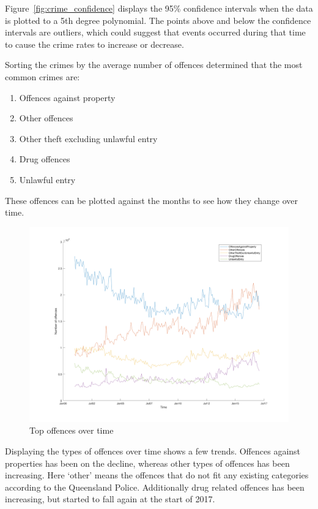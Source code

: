 \documentclass[]{article}
\begin{document}
Figure~\ref{fig:crime_confidence} displays the 95\% confidence intervals when the data is plotted to a 5th 
degree polynomial.
The points above and below the confidence intervals are outliers, which could suggest that events occurred
during that time to cause the crime rates to increase or decrease.


Sorting the crimes by the average number of offences determined that the most common crimes are:

\begin{enumerate}
    \item Offences against property
    \item Other offences
    \item Other theft excluding unlawful entry
    \item Drug offences
    \item Unlawful entry
\end{enumerate}

These offences can be plotted against the months to see how they change over time.

\begin{figure}[H]
    \caption{Top offences over time}
    \centering
    \includegraphics[width=\linewidth]{../images/top_offences_over_time}
\end{figure}

Displaying the types of offences over time shows a few trends.
Offences against properties has been on the decline, whereas other
types of offences has been increasing. Here `other' means the
offences that do not fit any existing categories according to the Queensland Police.
Additionally drug related offences has been increasing, but started to fall again at the start of 2017.
\end{document}
